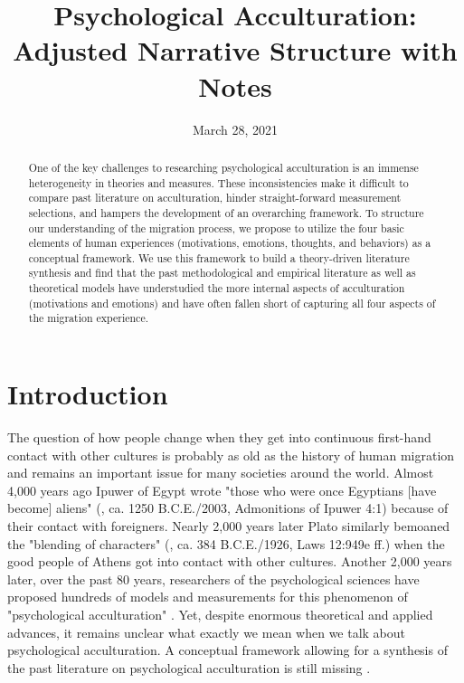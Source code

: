 \documentclass[nobib]{tufte-handout}
\title[Psychological Acculturation - Narrative]{Psychological Acculturation: \\
Adjusted Narrative Structure with Notes}
\author[Kreienkamp et al.]{}
\date{March 28, 2021}  %
\begin{document}
\maketitle %

\begin{abstract}
\noindent{}One of the key challenges to researching psychological acculturation is an immense heterogeneity in theories and measures. These inconsistencies make it difficult to compare past literature on acculturation, hinder straight-forward measurement selections, and hampers the development of an overarching framework. To structure our understanding of the migration process, we propose to utilize the four basic elements of human experiences (motivations, emotions, thoughts, and behaviors) as a conceptual framework. We use this framework to build a theory-driven literature synthesis and find that the past methodological and empirical literature as well as theoretical models have understudied the more internal aspects of acculturation (motivations and emotions) and have often fallen short of capturing all four aspects of the migration experience.
\end{abstract}


\section{Introduction}

The question of how people change when they get into continuous first-hand contact with other cultures is probably as old as the history of human migration and remains an important issue for many societies around the world. 
Almost 4,000 years ago Ipuwer of Egypt wrote "those who were once Egyptians [have become] aliens" (\citeauthor{Ipuwer2003}, ca. 1250 B.C.E./2003, Admonitions of Ipuwer 4:1) because of their contact with foreigners. Nearly 2,000 years later Plato similarly bemoaned the "blending of characters" (\citeauthor{Plato1926}, ca. 384 B.C.E./1926, Laws 12:949e ff.) when the good people of Athens got into contact with other cultures. Another 2,000 years later, over the past 80 years, researchers of the psychological sciences have proposed hundreds of models and measurements for this phenomenon of "psychological acculturation" \citep[][]{Rudmin2003a}. Yet, despite enormous theoretical and applied advances, it remains unclear what exactly we mean when we talk about psychological acculturation. A conceptual framework allowing for a synthesis of the past literature on psychological acculturation is still missing \citep{Birman2014c}.
\end{document}
